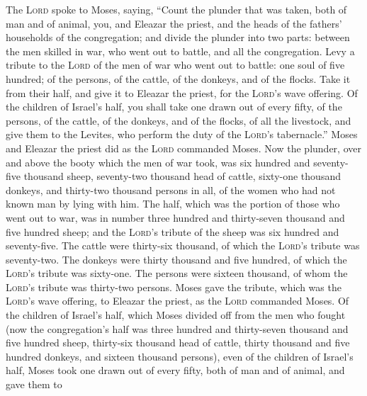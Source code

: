  The \textsc{Lord} spoke to Moses, saying,
 ``Count the plunder that was taken, both of man and of
animal, you, and Eleazar the priest, and the heads of the fathers'
households of the congregation;  and divide the plunder
into two parts: between the men skilled in war, who went out to battle,
and all the congregation.  Levy a tribute to the
\textsc{Lord} of the men of war who went out to battle: one soul of five
hundred; of the persons, of the cattle, of the donkeys, and of the
flocks.  Take it from their half, and give it to Eleazar
the priest, for the \textsc{Lord}'s wave offering.  Of
the children of Israel's half, you shall take one drawn out of every
fifty, of the persons, of the cattle, of the donkeys, and of the flocks,
of all the livestock, and give them to the Levites, who perform the duty
of the \textsc{Lord}'s tabernacle.''  Moses and Eleazar
the priest did as the \textsc{Lord} commanded Moses.  Now
the plunder, over and above the booty which the men of war took, was six
hundred and seventy-five thousand sheep,  seventy-two
thousand head of cattle,  sixty-one thousand donkeys,
 and thirty-two thousand persons in all, of the women who
had not known man by lying with him.  The half, which was
the portion of those who went out to war, was in number three hundred
and thirty-seven thousand and five hundred sheep;  and
the \textsc{Lord}'s tribute of the sheep was six hundred and
seventy-five.  The cattle were thirty-six thousand, of
which the \textsc{Lord}'s tribute was seventy-two.  The
donkeys were thirty thousand and five hundred, of which the
\textsc{Lord}'s tribute was sixty-one.  The persons were
sixteen thousand, of whom the \textsc{Lord}'s tribute was thirty-two
persons.  Moses gave the tribute, which was the
\textsc{Lord}'s wave offering, to Eleazar the priest, as the
\textsc{Lord} commanded Moses.  Of the children of
Israel's half, which Moses divided off from the men who fought
 (now the congregation's half was three hundred and
thirty-seven thousand and five hundred sheep,  thirty-six
thousand head of cattle,  thirty thousand and five
hundred donkeys,  and sixteen thousand persons),
 even of the children of Israel's half, Moses took one
drawn out of every fifty, both of man and of animal, and gave them to

